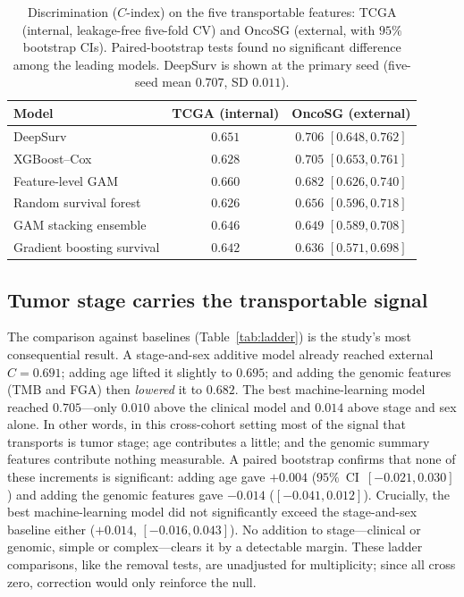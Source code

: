 \documentclass[journal]{IEEEtran}
\begin{document}
\begin{table}[t]
\caption{Discrimination ($C$-index) on the five transportable features: TCGA
(internal, leakage-free five-fold CV) and OncoSG (external, with $95\%$
bootstrap CIs). Paired-bootstrap tests found no significant difference among the
leading models. DeepSurv is shown at the primary seed (five-seed mean $0.707$,
SD $0.011$).}
\label{tab:cindex}
\centering
\begin{tabular}{lcc}
\toprule
Model & TCGA (internal) & OncoSG (external) \\
\midrule
DeepSurv                     & $0.651$ & $0.706$ $[0.648,0.762]$ \\
XGBoost--Cox                 & $0.628$ & $0.705$ $[0.653,0.761]$ \\
Feature-level GAM            & $0.660$ & $0.682$ $[0.626,0.740]$ \\
Random survival forest       & $0.626$ & $0.656$ $[0.596,0.718]$ \\
GAM stacking ensemble        & $0.646$ & $0.649$ $[0.589,0.708]$ \\
Gradient boosting survival   & $0.642$ & $0.636$ $[0.571,0.698]$ \\
\bottomrule
\end{tabular}
\end{table}

\subsection{Tumor stage carries the transportable signal}
The comparison against baselines (Table~\ref{tab:ladder}) is the study's most
consequential result. A stage-and-sex additive model already reached external
$C=0.691$; adding age lifted it slightly to $0.695$; and adding the genomic
features (TMB and FGA) then \emph{lowered} it to $0.682$. The best
machine-learning model reached $0.705$---only $0.010$ above the clinical model
and $0.014$ above stage and sex alone. In other words, in this cross-cohort
setting most of the signal that transports is tumor stage; age contributes a
little; and the genomic summary features contribute nothing measurable. A paired
bootstrap confirms that none of these increments is significant: adding age gave
$+0.004$ ($95\%$~CI~$[-0.021,0.030]$) and adding the genomic features gave
$-0.014$ ($[-0.041,0.012]$). Crucially, the best machine-learning model did not
significantly exceed the stage-and-sex baseline either ($+0.014$,
$[-0.016,0.043]$). No addition to stage---clinical or genomic, simple or
complex---clears it by a detectable margin. These ladder comparisons, like the
removal tests, are unadjusted for multiplicity; since all cross zero, correction
would only reinforce the null.
\end{document}
